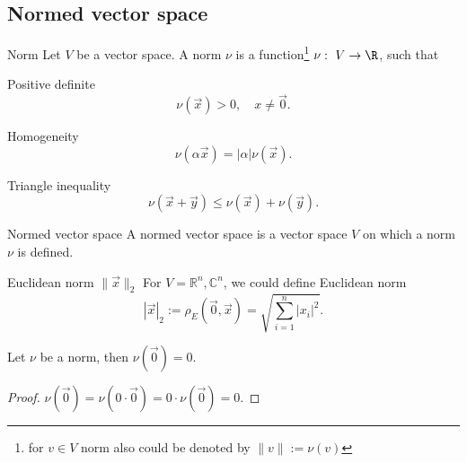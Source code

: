 \newpage
\subsection*{Normed vector space}
\begin{definition}{Norm}{}
    Let $V$ be a vector space. A norm $\nu$ is a function\footnote{for $v\in V$ norm also could be denoted by $\|v\|:=\nu(v)$} $\nu: \ V \to \R$, such that 
    \begin{enumerate*}
        \item Positive definite
        \[ 
            \nu\left(\vec{x}\right) > 0,\quad x\neq\vec{0}.
        \]
        \item Homogeneity \[
            \nu\left(\alpha \vec{x}\right) = |\alpha|\nu\left(\vec{x}\right).
        \]
        \item Triangle inequality
        \[ 
            \nu\left(\vec{x} + \vec{y}\right) \leq \nu\left(\vec{x}\right) + \nu\left(\vec{y}\right).
        \]
    \end{enumerate*}
\end{definition}
\begin{definition}{Normed vector space}{}
    A normed vector space is a vector space $V$ on which a norm $\nu$ is defined.
\end{definition}


\begin{definition}{ Euclidean norm  $\|\vec{x}\|_2$}{}
    For $V=\mathbb{R}^n,\mathbb{C}^n$, we could define Euclidean norm
        \[
            \left|\vec{x}\right|_2 :=\rho_E(\vec{0},\vec{x})= \sqrt{\sum\limits_{i=1}^n |x_i|^2}.    
        \]
\end{definition}

\begin{lemma}{}{}
    Let $\nu$ be a norm, then 
    $\nu\left(\vec{0}\right) = 0$.
\end{lemma}
\begin{proof}
    $\nu\left(\vec{0}\right)=\nu\left(0 \cdot \vec{0}\right) = 0 \cdot \nu\left(\vec{0}\right) = 0.$
\end{proof}
    
